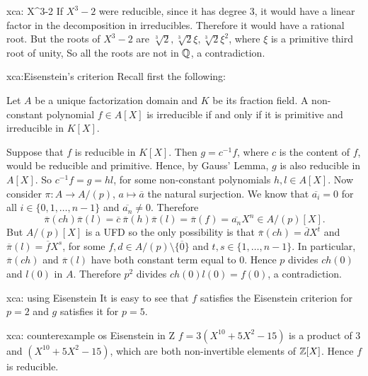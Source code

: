 \begin{sol}{xca: X^3-2}
    If $X^3-2$ were reducible, since it has degree 3,
    it would have a linear
    factor in the decomposition in irreducibles.
    Therefore it would have a rational root.
    But the roots of $X^3-2$ are $\sqrt[3]{2},\sqrt[3]{2}\xi,\sqrt[3]{2}\xi^2$,
    where $\xi$ is a primitive third root of unity,
    So all the roots are not in $\mathbb{Q}$, a contradiction.
\end{sol}

\begin{sol}{xca:Eisenstein's criterion}
Recall first the following:
\begin{lemma}
    Let $A$ be a unique factorization domain and $K$ be its fraction field.
    A non-constant polynomial $f\in A[X]$ is irreducible if and only if it is primitive and irreducible in $K[X]$.
\end{lemma}

    Suppose that $f$ is reducible in $K[X]$.
    Then $g=c^{-1}f$, where $c$ is the content of $f$,
    would be reducible and primitive.
    Hence, by Gauss' Lemma, $g$ is also 
    reducible in $A[X]$.
    So $c^{-1}f=g=hl$, for some non-constant polynomials $h,l\in A[X]$.
    Now consider $\pi:A\to A/(p)$, $a\mapsto \overline{a}$ the natural surjection.
    We know that $\overline{a_i}=0$ for all 
    $i\in\{0,1,\dots, n-1\}$ and $\overline{a_n}\neq 0$.
    Therefore 
    \[
    \overline{\pi}(ch)\overline{\pi}(l)=\overline{c}\:\overline{\pi}(h)\overline{\pi}(l)=\overline{\pi}(f)=\overline{a_n}X^n\in  A/(p)[X].
    \]
    But $A/(p)[X]$ is a UFD so the only possibility
    is that $\overline{\pi}(ch)=\overline{d}X^t$ and $\overline{\pi}(l)=\overline{f}X^s$, for
    some $f,d\in A/(p)\setminus\{\overline{0}\}$
    and $t,s\in\{1,\dots, n-1\}$.
    In particular, $\overline{\pi}(ch)$ and $\overline{\pi}(l)$ have both constant term 
    equal to 0.
    Hence $p$ divides $ch(0)$ and $l(0)$ in $A$.
    Therefore $p^2$ divides $ch(0)l(0)=f(0)$,
    a contradiction.
\end{sol}

\begin{sol}{xca: using Eisenstein}
It is easy to see that $f$ satisfies the Eisenstein criterion for $p=2$
and $g$ satisfies it for $p=5$. 
\end{sol}

\begin{sol}{xca: counterexample os Eisenstein in Z}
    $f=3(X^10+5X^2-15)$ is a product of $3$ and $(X^10+5X^2-15)$,
    which are both non-invertible elements of $\mathbb{Z}[X]$.
    Hence $f$ is reducible.
\end{sol}

